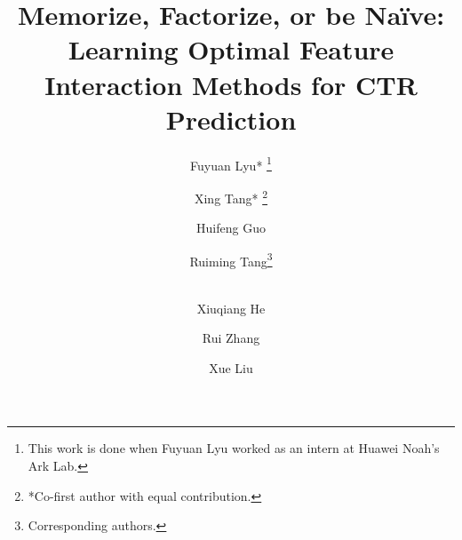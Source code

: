 \documentclass[conference]{IEEEtran}
\begin{document}
\title{Memorize, Factorize, or be Naïve: Learning Optimal Feature Interaction Methods for CTR Prediction}

\author[1,2]{Fuyuan Lyu* \dag \thanks{\dag This work is done when Fuyuan Lyu worked as an intern at Huawei Noah’s Ark Lab.}}
\author[2]{Xing Tang* \thanks{*Co-first author with equal contribution.}}
\author[2]{Huifeng Guo}
\author[2]{Ruiming Tang\ddag \thanks{\ddag  Corresponding authors.}}
\author[2]{\\Xiuqiang He} 
\author[3]{Rui Zhang\ddag}
\author[1]{Xue Liu}


\maketitle

\newcommand{\ruiming}[1]{{\bf \color{red} [[Ruiming says ``#1'']]}}
\newcommand{\change}[1]{#1}
\newcommand{\info}[1]{}
\end{document}
